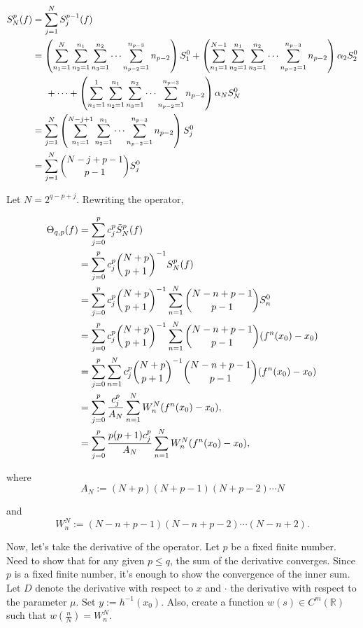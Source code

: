 \documentclass[12pt]{article}
\newcommand{\R}{\mathbb{R}}
\begin{document}
\begin{equation*}\begin{split}
S_N^p (f) &= \sum_{j=1}^N S_j^{p-1} (f) \\
&= \left( \sum_{n_1=1}^{N} \sum_{n_2=1}^{n_1} \sum_{n_3=1}^{n_2} \cdots \sum_{n_{p-2}=1}^{n_{p-3}} n_{p-2} \right) S_1^0 + \left( \sum_{n_1=1}^{N-1} \sum_{n_2=1}^{n_1} \sum_{n_3=1}^{n_2} \cdots \sum_{n_{p-2}=1}^{n_{p-3}} n_{p-2} \right) \alpha_2 S_2^0 \\& \hspace{0.2in} + \cdots + \left( \sum_{n_1=1}^{1} \sum_{n_2=1}^{n_1} \sum_{n_3=1}^{n_2} \cdots \sum_{n_{p-2}=1}^{n_{p-3}} n_{p-2} \right)\alpha_N S_N^0\\
&= \sum_{j=1}^{N} \left( \sum_{n_1=1}^{N-j+1} \sum_{n_2=1}^{n_1} \cdots \sum_{n_{p-2}=1}^{n_{p-3}} n_{p-2}\right) S_j^0\\
&= \sum_{j=1}^{N} {N-j+p-1 \choose p-1} S_j^0
\end{split}\end{equation*}

Let $N=2^{q-p+j}$. Rewriting the operator,

\begin{equation*}\begin{split}
\Theta_{q,p}(f)
& = \sum_{j=0}^{p} c_j^p \Tilde{S}_{N}^{p}(f) \\
& = \sum_{j=0}^{p} c_j^p {N+p \choose p+1}^{-1} S_{N}^{p}(f) \\
& = \sum_{j=0}^{p} c_j^p {N+p \choose p+1}^{-1} \sum_{n=1}^{N} {N-n+p-1 \choose p-1}S_n^0 \\
& = \sum_{j=0}^{p} c_j^p {N+p \choose p+1}^{-1} \sum_{n=1}^{N} {N-n+p-1 \choose p-1}(f^n(x_0)-x_0) \\
& = \sum_{j=0}^{p} \sum_{n=1}^{N} c_j^p {N+p \choose p+1}^{-1} {N-n+p-1 \choose p-1}(f^n(x_0)-x_0) \\
& = \sum_{j=0}^{p} \frac{c_j^p}{A_N} \sum_{n=1}^{N} W_n^N  (f^n(x_0)-x_0), \\
& = \sum_{j=0}^{p} \frac{p(p+1)c_j^p}{A_N} \sum_{n=1}^{N} W_n^N  (f^n(x_0)-x_0), \\
\end{split}\end{equation*}

where $$A_N := (N+p)(N+p-1)(N+p-2)\cdots N$$ 

and $$W_n^N := (N-n+p-1)(N-n+p-2)\cdots(N-n+2).$$

Now, let's take the derivative of the operator. Let $p$ be a fixed finite number. Need to show that for any given $p \leq q$, the sum of the derivative converges. Since $p$ is a fixed finite number, it's enough to show the convergence of the inner sum. Let $D$ denote the derivative with respect to $x$ and $\cdot$ the derivative with respect to the parameter $\mu$. Set $y:=h^{-1}(x_0)$. Also, create a function $w(s) \in C^m(\R)$ such that $w(\frac{n}{N}) = W_n^N$.
\end{document}
